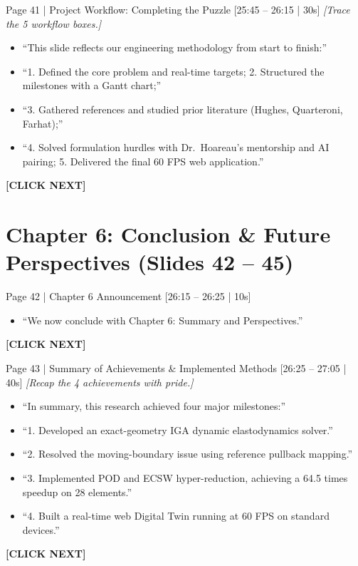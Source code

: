 \documentclass[9pt,a4paper]{article}
\begin{document}
\begin{slidebox}{Page 41 | Project Workflow: Completing the Puzzle \hfill [25:45 -- 26:15 | 30s]}
\textit{[Trace the 5 workflow boxes.]}
\begin{itemize}
  \item ``This slide reflects our engineering methodology from start to finish:''
  \item ``1. Defined the core problem and real-time targets; 2. Structured the milestones with a Gantt chart;''
  \item ``3. Gathered references and studied prior literature (Hughes, Quarteroni, Farhat);''
  \item ``4. Solved formulation hurdles with Dr.~Hoareau's mentorship and AI pairing; 5. Delivered the final 60 FPS web application.''
\end{itemize}
\textbf{\color{cnamred}[CLICK NEXT]}
\end{slidebox}

\section*{Chapter 6: Conclusion \& Future Perspectives (Slides 42 -- 45)}

\begin{slidebox}{Page 42 | Chapter 6 Announcement \hfill [26:15 -- 26:25 | 10s]}
\begin{itemize}
  \item ``We now conclude with Chapter 6: Summary and Perspectives.''
\end{itemize}
\textbf{\color{cnamred}[CLICK NEXT]}
\end{slidebox}

\begin{slidebox}{Page 43 | Summary of Achievements \& Implemented Methods \hfill [26:25 -- 27:05 | 40s]}
\textit{[Recap the 4 achievements with pride.]}
\begin{itemize}
  \item ``In summary, this research achieved four major milestones:''
  \item ``1. Developed an exact-geometry IGA dynamic elastodynamics solver.''
  \item ``2. Resolved the moving-boundary issue using reference pullback mapping.''
  \item ``3. Implemented POD and ECSW hyper-reduction, achieving a 64.5 times speedup on 28 elements.''
  \item ``4. Built a real-time web Digital Twin running at 60 FPS on standard devices.''
\end{itemize}
\textbf{\color{cnamred}[CLICK NEXT]}
\end{slidebox}
\end{document}
